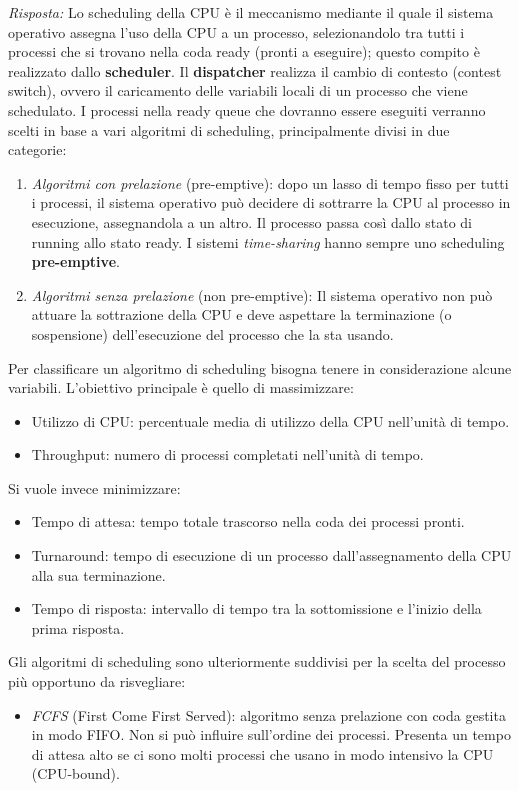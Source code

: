 \documentclass{article}
\newenvironment{solution}
    {\textit{Risposta:}}
    {}
\begin{document}
\begin{solution}
Lo scheduling della CPU è il meccanismo mediante il quale il sistema operativo assegna l’uso della CPU a un processo, selezionandolo tra tutti i processi che si trovano nella coda ready (pronti a eseguire); questo compito è realizzato dallo \textbf{scheduler}.
\newline
\newline
Il \textbf{dispatcher} realizza il cambio di contesto (contest switch), ovvero il caricamento delle variabili locali di un processo che viene schedulato.
\newline
\newline
I processi nella ready queue che dovranno essere eseguiti verranno scelti in base a vari algoritmi di scheduling, principalmente divisi in due categorie:
\begin{enumerate}
    \item \emph{Algoritmi con prelazione} (pre-emptive): dopo un lasso di tempo fisso per tutti i processi, il sistema operativo può decidere di sottrarre la CPU al processo in esecuzione, assegnandola a un altro. Il processo passa così dallo stato di running allo stato ready.
    \newline
    I sistemi \textit{time-sharing} hanno sempre uno scheduling \textbf{pre-emptive}.
    
    \item \emph{Algoritmi senza prelazione} (non pre-emptive): Il sistema operativo non può attuare la sottrazione della CPU e deve aspettare la terminazione (o sospensione) dell’esecuzione del processo che la sta usando.
\end{enumerate}
Per classificare un algoritmo di scheduling bisogna tenere in considerazione alcune variabili.  L’obiettivo principale è quello di massimizzare: 
\begin{itemize}
    \item Utilizzo di CPU: percentuale media di utilizzo della CPU nell’unità di tempo.
    \item Throughput: numero di processi completati nell’unità di tempo.
\end{itemize}
Si vuole invece minimizzare:
\begin{itemize}
    \item Tempo di attesa: tempo totale trascorso nella coda dei processi pronti.
    \item Turnaround: tempo di esecuzione di un processo dall’assegnamento della CPU alla sua terminazione.
    \item Tempo di risposta: intervallo di tempo tra la sottomissione e l’inizio della prima risposta.
\end{itemize}
Gli algoritmi di scheduling sono ulteriormente suddivisi per la scelta del processo più opportuno da risvegliare:
\begin{itemize}
    \item \emph{FCFS} (First Come First Served): algoritmo senza prelazione con coda gestita in modo FIFO.
    \newline
    Non si può influire sull’ordine dei processi. Presenta un tempo di attesa alto se ci sono molti processi che usano in modo intensivo la CPU (CPU-bound).
    

\end{itemize}
\end{solution}
\end{document}
